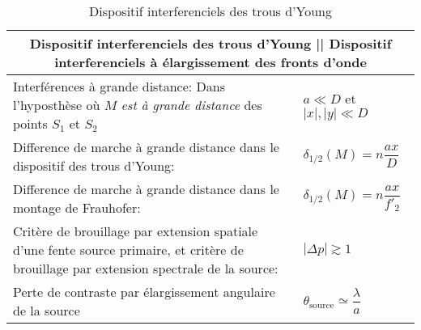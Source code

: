 \documentclass[10pt,a4paper,titlepage,landscape]{article}
\renewcommand{\arraystretch}{2}
\begin{document}
\begin{table}[H]
    \centering
    \renewcommand{\arraystretch}{1.5} %
    \setlength{\tabcolsep}{8pt} %
    \begin{tabular}{@{}|p{9cm}|p{10cm}@{}|}

        \multicolumn{2}{c}{\textbf{Dispositif interferenciels des trous d'Young || Dispositif interferenciels à élargissement des fronts d'onde}} \\ \hline

        Interférences à grande distance: Dans l'hyposthèse où $M$ \textit{est à grande distance} des points $S_1$ et $S_2$& $a \ll D $ et $|x|, |y| \ll D$ \\ \hline
        Difference de marche à grande distance dans le dispositif des trous d'Young: & $\delta_{1/2}(M) = n\dfrac{ax}{D}$ \\ \hline
        Difference de marche à grande distance dans le montage de Frauhofer: & $\delta_{1/2}(M) = n\dfrac{ax}{f'_2}$ \\ \hline
        Critère de brouillage par extension spatiale d'une fente source primaire, et critère de brouillage par extension spectrale de la source: & $|\Delta p|\gtrsim 1$ \\ \hline
        Perte de contraste par élargissement angulaire de la source & $\theta_{\mathrm{source}}\simeq \dfrac{\lambda}{a}$\\ \hline
    \end{tabular}
\caption{Dispositif interferenciels des trous d'Young}
\label{tab:intermichel}
\end{table}
\end{document}
